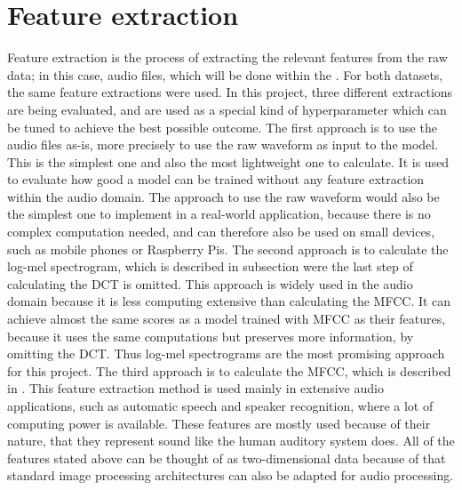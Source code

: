 \section{Feature extraction}
\label{sec:Feature-Extraction}
Feature extraction is the process of extracting the relevant features from the raw data; in this case, audio files, which will be done within the . For both datasets, the same feature extractions were used. In this project, three different extractions are being evaluated, and are used as a special kind of hyperparameter which can be tuned to achieve the best possible outcome.
\newline
\newline
The first approach is to use the audio files as-is, more precisely to use the raw waveform as input to the model. This is the simplest one and also the most lightweight one to calculate. It is used to evaluate how good a model can be trained without any feature extraction within the audio domain. The approach to use the raw waveform would also be the simplest one to implement in a real-world application, because there is no complex computation needed, and can therefore also be used on small devices, such as mobile phones or Raspberry Pis.
\newline
\newline
The second approach is to calculate the log-mel spectrogram, which is described in subsection  were the last step of calculating the \gls{DCT} is omitted. This approach is widely used in the audio domain because it is less computing extensive than calculating the \gls{MFCC}. It can achieve almost the same scores as a model trained with \gls{MFCC} as their features, because it uses the same computations but preserves more information, by omitting the \gls{DCT}. Thus log-mel spectrograms are the most promising approach for this project.
\newline
\newline
The third approach is to calculate the \gls{MFCC}, which is described in . This feature extraction method is used mainly in extensive audio applications, such as automatic speech and speaker recognition, where a lot of computing power is available. These features are mostly used because of their nature, that they represent sound like the human auditory system does.
\newline
\newline
All of the features stated above can be thought of as two-dimensional data because of that standard image processing architectures can also be adapted for audio processing.


